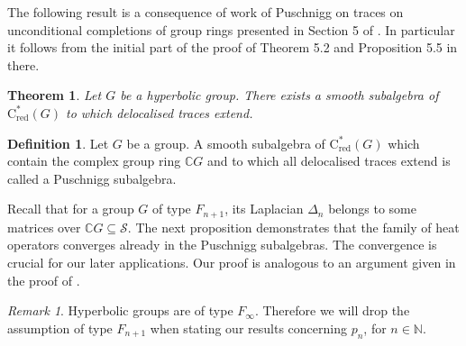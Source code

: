 \documentclass[a4paper,leqno,12pt]{article}
\numberwithin{equation}{section}
\theoremstyle{plain}
\newtheorem{proposition}[theoremcounter]{Proposition}
\newtheorem{theorem}[theoremcounter]{Theorem}
\theoremstyle{definition}
\newtheorem{definition}[theoremcounter]{Definition}
\theoremstyle{remark}
\newtheorem{remark}[theoremcounter]{Remark}
\newcommand{\Csr}{\mathrm{C}^*_{\text{red}}}
\begin{document}
	The following result is a consequence of work of Puschnigg on traces on unconditional completions of group rings presented in Section 5 of \cite{puschnigg2010}. In particular it follows from the initial part of the proof of Theorem 5.2 and Proposition 5.5 in there.
	
	\begin{theorem} 
		\cite[Section 5]{puschnigg2010}
		Let $G$ be a hyperbolic group. There exists a smooth subalgebra of $\Csr(G)$ to which delocalised traces extend.
	\end{theorem}
    \begin{definition}
    	Let $G$ be a group. A smooth subalgebra of $\Csr(G)$ which contain the complex group ring $\mathbb CG$ and to which all delocalised traces extend is called a Puschnigg subalgebra.
    \end{definition}
    
 Recall that for a group $G$ of type $F_{n+1}$, its Laplacian $\Delta_n$ belongs to some matrices over $ \mathbb CG \subseteq \mathcal S$.
%	
%	
The next proposition demonstrates that the family of heat operators converges already in the Puschnigg subalgebras. The convergence is crucial for our later applications. Our proof is analogous to an argument given in the proof of \cite[Lemma 4]{lott1999}. 



\begin{remark}
    Hyperbolic groups are of type $F_{\infty}$. Therefore we will drop the assumption of type $F_{n+1}$ when stating our results concerning $p_n$, for $n\in \mathbb N$.
\end{remark}
\end{document}
